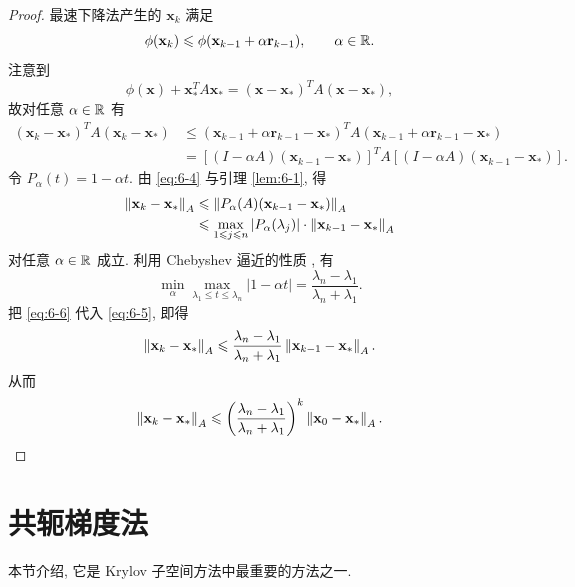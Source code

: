 \begin{proof}
最速下降法产生的 $\mathbf{x}_k$ 满足
\[
  \phi(\mathbf{x}_k)\leqslant\phi(\mathbf{x}_{k-1}+\alpha\mathbf{r}_{k-1}),
  \qquad\alpha\in\mathbb{R}.
\]
注意到
\[
  \phi(\mathbf{x})+\mathbf{x}_*^TA\mathbf{x}_*=(\mathbf{x}-\mathbf{x}_*)^TA(\mathbf{x}-\mathbf{x}_*),
\]
故对任意 $\alpha\in\mathbb{R}$ 有
\begin{equation}
  \begin{aligned}
    (\mathbf{x}_k-\mathbf{x}_*)^TA(\mathbf{x}_k-\mathbf{x}_*)
    &\leqslant(\mathbf{x}_{k-1}+\alpha\mathbf{r}_{k-1}-\mathbf{x}_*)^T
      A(\mathbf{x}_{k-1}+\alpha\mathbf{r}_{k-1}-\mathbf{x}_*)\\
    &=[(I-\alpha A)(\mathbf{x}_{k-1}-\mathbf{x}_*)]^T
      A[(I-\alpha A)(\mathbf{x}_{k-1}-\mathbf{x}_*)].
  \end{aligned}
  \label{eq:6-4}
\end{equation}
令 $P_\alpha(t)=1-\alpha t$. 由 \eqref{eq:6-4} 与引理 \ref{lem:6-1}, 得
\begin{equation}
  \begin{aligned}
    \left\|\mathbf{x}_k-\mathbf{x}_*\right\|_A
    &\leqslant\left\|P_\alpha(A)(\mathbf{x}_{k-1}-\mathbf{x}_*)\right\|_A\\
    &\leqslant\max_{1\leqslant j\leqslant n}|P_\alpha(\lambda_j)|
      \cdot\left\|\mathbf{x}_{k-1}-\mathbf{x}_*\right\|_A
  \end{aligned}
  \label{eq:6-5}
\end{equation}
对任意 $\alpha\in\mathbb{R}$ 成立. 利用 Chebyshev 逼近的性质 \cite{src:70}, 有
\begin{equation}
  \min_\alpha\max_{\lambda_1\leqslant t\leqslant\lambda_n}|1-\alpha t|
  =\frac{\lambda_n-\lambda_1}{\lambda_n+\lambda_1}.
  \label{eq:6-6}
\end{equation}
把 \eqref{eq:6-6} 代入 \eqref{eq:6-5}, 即得
\[
  \left\|\mathbf{x}_k-\mathbf{x}_*\right\|_A
  \leqslant\frac{\lambda_n-\lambda_1}{\lambda_n+\lambda_1}
  \left\|\mathbf{x}_{k-1}-\mathbf{x}_*\right\|_A.
\]
从而
\[
  \left\|\mathbf{x}_k-\mathbf{x}_*\right\|_A
  \leqslant\left(\frac{\lambda_n-\lambda_1}{\lambda_n+\lambda_1}\right)^k
  \left\|\mathbf{x}_0-\mathbf{x}_*\right\|_A.
  \qedhere
\]
\end{proof}

\section{共轭梯度法}
\label{sec:6-2}

本节介绍, 它是 Krylov 子空间方法中最重要的方法之一.

